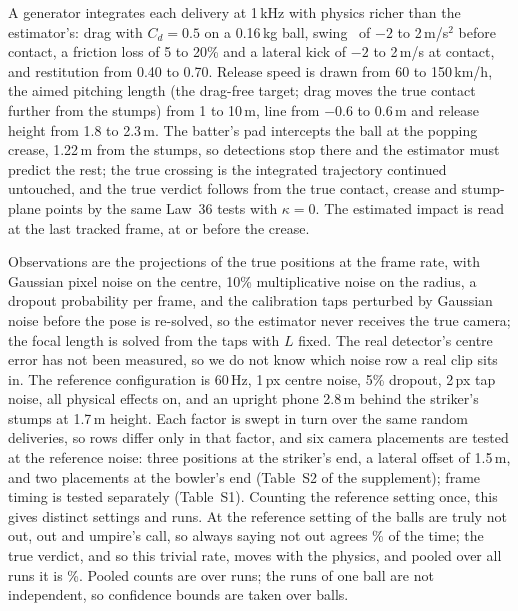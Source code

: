 \documentclass[journal]{IEEEtran}
\begin{document}
A generator integrates each delivery at 1\,kHz with physics richer than the estimator's: drag with $C_d =
0.5$ on a 0.16\,kg ball, swing~\cite{mehta2005swing} of $-2$ to 2\,m/s$^2$ before contact, a friction loss
of 5 to 20\% and a lateral kick of $-2$ to 2\,m/s at contact, and restitution from 0.40 to 0.70. Release speed is drawn from 60 to 150\,km/h, the aimed
pitching length (the drag-free target; drag moves the true contact further from the stumps) from 1 to
10\,m, line from $-0.6$ to $0.6$\,m and release height from 1.8 to 2.3\,m. The batter's pad intercepts the ball at
the popping crease, 1.22\,m from the stumps, so detections stop there and the estimator must predict the rest; the
true crossing is the integrated trajectory continued untouched, and the true verdict follows from the true
contact, crease and stump-plane points by the same Law~36 tests with $\kappa = 0$. The estimated impact is
read at the last tracked frame, at or before the crease.

Observations are the projections of the true positions at the frame rate, with Gaussian pixel noise on the
centre, 10\% multiplicative noise on the radius, a dropout probability per frame, and the calibration taps
perturbed by Gaussian noise before the pose is re-solved, so the estimator never receives the true camera; the focal length is solved from the taps with $L$ fixed.
The real detector's centre error has not been measured, so we do not know which noise row a real clip sits in.
The reference configuration is 60\,Hz, 1\,px centre noise, 5\% dropout, 2\,px tap noise, all physical effects
on, and an upright phone 2.8\,m behind the striker's stumps at 1.7\,m height. Each factor is swept in turn over
the same \GeoBalls{} random deliveries, so rows differ only in that factor, and six camera placements are
tested at the reference noise: three positions at the striker's end, a lateral offset of 1.5\,m, and two
placements at the bowler's end (Table~S2 of the supplement); frame timing is tested separately
(Table~S1). Counting the reference setting once, this gives \GeoSettings{} distinct settings and \GeoRuns{}
runs. At the reference setting \RefNotOutBalls{} of the \GeoBalls{} balls are truly not out,
\RefOutBalls{} out and \RefUmpBalls{} umpire's call, so always saying not out agrees
\RefAlwaysNotOutPct\% of the time; the true verdict, and so this trivial rate, moves with the
physics, and pooled over all runs it is \GeoAlwaysNotOutPct\%. Pooled counts are over runs; the runs of
one ball are not independent, so confidence bounds are taken over balls.
\end{document}
